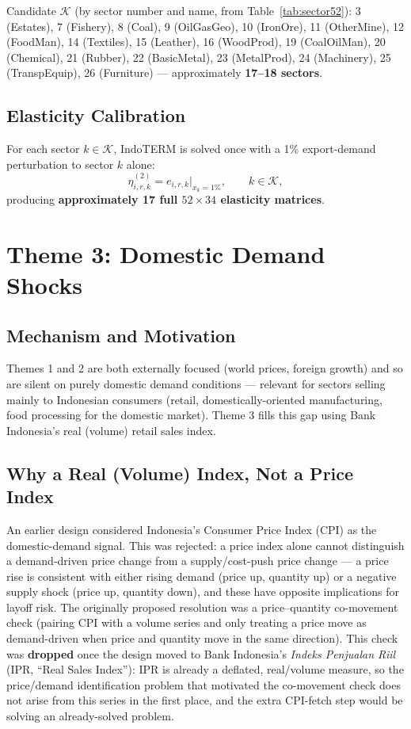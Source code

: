 \documentclass[11pt]{article}
\begin{document}
Candidate $\mathcal{K}$ (by sector number and name, from
Table~\ref{tab:sector52}): 3 (Estates), 7 (Fishery), 8 (Coal), 9 (OilGasGeo),
10 (IronOre), 11 (OtherMine), 12 (FoodMan), 14 (Textiles), 15 (Leather), 16
(WoodProd), 19 (CoalOilMan), 20 (Chemical), 21 (Rubber), 22 (BasicMetal), 23
(MetalProd), 24 (Machinery), 25 (TranspEquip), 26 (Furniture) --- approximately
\textbf{17--18 sectors}.

\subsection{Elasticity Calibration}

For each sector $k \in \mathcal{K}$, IndoTERM is solved once with a 1\%
export-demand perturbation to sector $k$ alone:
\begin{equation}
  \eta_{i,r,k}^{(2)} = e_{i,r,k}\Big|_{x_k = 1\%}, \qquad k \in \mathcal{K},
\end{equation}
producing \textbf{approximately 17 full $52\times34$ elasticity matrices}.

\section{Theme 3: Domestic Demand Shocks}
\label{sec:theme3}

\subsection{Mechanism and Motivation}

Themes 1 and 2 are both externally focused (world prices, foreign growth)
and so are silent on purely domestic demand conditions --- relevant for
sectors selling mainly to Indonesian consumers (retail, domestically-oriented
manufacturing, food processing for the domestic market). Theme 3 fills this
gap using Bank Indonesia's real (volume) retail sales index.

\subsection{Why a Real (Volume) Index, Not a Price Index}

An earlier design considered Indonesia's Consumer Price Index (CPI) as the
domestic-demand signal. This was rejected: a price index alone cannot
distinguish a demand-driven price change from a supply/cost-push price
change --- a price rise is consistent with either rising demand (price up,
quantity up) or a negative supply shock (price up, quantity down), and these
have opposite implications for layoff risk. The originally proposed
resolution was a price--quantity co-movement check (pairing CPI with a
volume series and only treating a price move as demand-driven when price and
quantity move in the same direction). This check was \textbf{dropped} once
the design moved to Bank Indonesia's \emph{Indeks Penjualan Riil} (IPR,
``Real Sales Index''): IPR is already a deflated, real/volume measure, so
the price/demand identification problem that motivated the co-movement check
does not arise from this series in the first place, and the extra CPI-fetch
step would be solving an already-solved problem.
\end{document}
